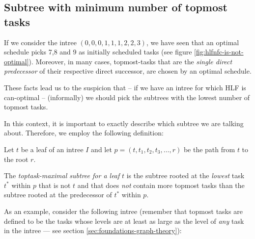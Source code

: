 \subsection{Subtree with minimum number of topmost tasks}
\label{sec:suboptimal-hlf-can-optimal-subtree-fewest-toptasks}

If we consider the intree $(0,0,0,1,1,1,2,2,3)$, we have seen that an optimal schedule picks 7,8 and 9 as initially scheduled tasks (see figure \ref{fig:hlfnfc-is-not-optimal}). Moreover, in many cases, topmost-tasks that are the \emph{single direct predecessor} of their respective direct successor, are chosen by an optimal schedule.

These facts lead us to the suspicion that -- if we have an intree for which HLF is can-optimal -- (informally) we should pick the subtrees with the lowest number of topmost tasks. 

In this context, it is important to exactly describe which subtree we are talking about. Therefore, we employ the following definition:

\begin{definition}
  Let $t$ be a leaf of an intree $I$ and let $p=(t, t_1, t_2, t_3, \dots, r)$ be the path from $t$ to the root $r$.

  The \emph{toptask-maximal subtree for a leaf} $t$ is the subtree rooted at the \emph{lowest} task $t^*$ within $p$ that is not $t$ and that does \emph{not} contain more topmost tasks than the subtree rooted at the predecessor of $t^*$ within $p$.
\end{definition}

As an example, consider the following intree (remember that topmost tasks are defined to be the tasks whose levels are at least as large as the level of \emph{any} task in the intree --- see section \ref{sec:foundations-graph-theory}):

\begin{center}
\end{center}

